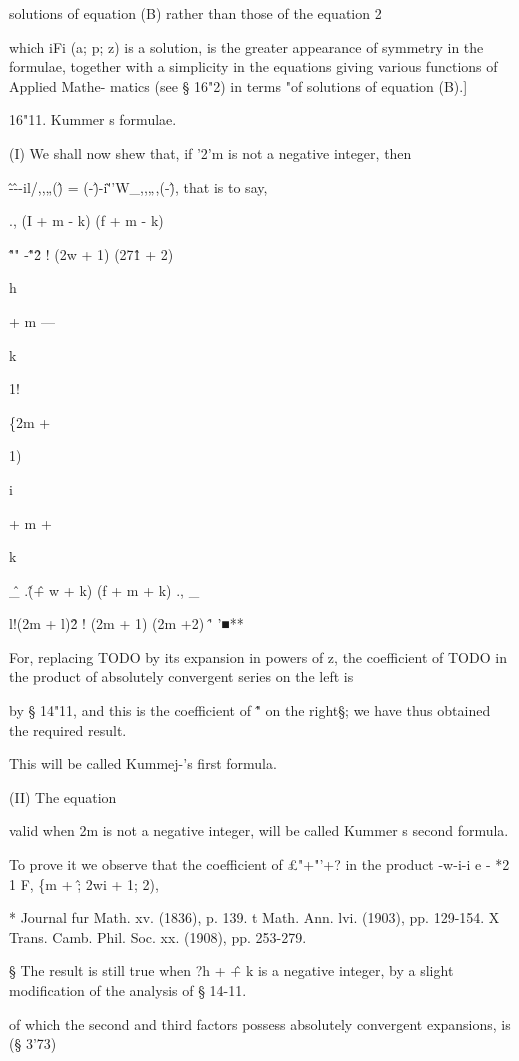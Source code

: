 solutions of equation (B) rather than those of the equation 2

which iFi (a; p; z) is a solution, is the greater appearance of
symmetry in the formulae, together with a simplicity in the equations
giving various functions of Applied Mathe- matics (see § 16"2) in
terms "of solutions of equation (B).]

16"11. Kummer s formulae.

(I) We shall now shew that, if '2'm is not a negative integer, then

\^-\^--il/,,„(\^) = (-\^)-i\~''W\_,,„,(-\^), that is to say,

., (I + m - k) (f + m - k)

\^ "" -\^"\^ 2 ! (2w + 1) (27\^1 + 2)

h

+ m —

k

1!

\{2m +

1)

i

+ m +

k

\^ \_ .\^ (\^ + w + k) (f + m + k) ., \_

l!(2m + l)\^ 2 ! (2m + 1) (2m +2) \^' '■**

For, replacing TODO by its expansion in powers of z, the coefficient
of TODO in the product of absolutely convergent series on the left is

by § 14"11, and this is the coefficient of \^" on the right§; we have
thus obtained the required result.

This will be called Kummej-'s first formula.

(II) The equation

valid when 2m is not a negative integer, will be called Kummer s
second formula.

To prove it we observe that the coefficient of £"+"'+? in the product
-w-i-i e - *2 1 F, \{m + \^; 2wi + 1; 2),

* Journal fur Math. xv. (1836), p. 139. t Math. Ann. lvi. (1903), pp.
129-154. X Trans. Camb. Phil. Soc. xx. (1908), pp. 253-279.

§ The result is still true when ?h + \^ + k is a negative integer, by
a slight modification of the analysis of § 14-11.

%
%

of which the second and third factors possess absolutely convergent
expansions, is (§ 3'73)

